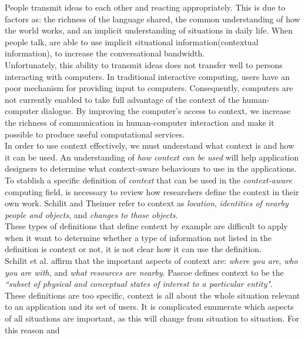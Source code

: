 People transmit ideas to each other and reacting appropriately. This
is due to factors as: the richness of the language shared, the common
understanding of how the world works, and an implicit understanding of
situations in daily life. When people talk, are able to use implicit
situational information(contextual information), to increase the
conversational bandwidth. \\Unfortunately, this ability to transmit
ideas does not transfer well to persons interacting with computers. In
traditional interactive computing, users have an poor mechanism for
providing input to computers. Consequently, computers are not
currently enabled to take full advantage of the context of the 
human-computer dialogue. By improving the computer's access to context, 
we increase the richness of communication in human-computer interaction
and make it possible to produce useful computational 
services.\\
In order to use context effectively, we must understand what context
is and how it can be used. An understanding of \textit{how context can
be used} will help application designers to determine what 
context-aware behaviours to use in the
applications\cite{dey2001understanding}.\\
To stablish a specific definition of \textit{context} that can be used
in the \textit{context-aware} computing field, is necessary to review
how researchers define the context in their own work. Schilit and
Theimer\cite{abowd1999towards} refer to context as \textit{location},
\textit{identities of nearby people and objects}, and \textit{changes
to those objects}.\\
These types of definitions that define context by example
are difficult to apply when it want to determine whether a type of
information not listed in the definition is context or not, it is not
clear how it can use the definition.\\ 
Schilit et al.\cite{schilit1994context} affirm that the important
aspects of context are: \textit{where you are}, \textit{who you are
with}, and \textit{what resources are nearby}.
Pascoe\cite{pascoe1998adding} defines context to be the
\textit{``subset of physical and  conceptual states of interest to a
particular entity"}.\\
These definitions are too specific, context is all about the
whole situation relevant to an application and its set of users. It is
complicated enumerate which aspects of all situations are important,
as this will change from situation to situation. For this reason and
